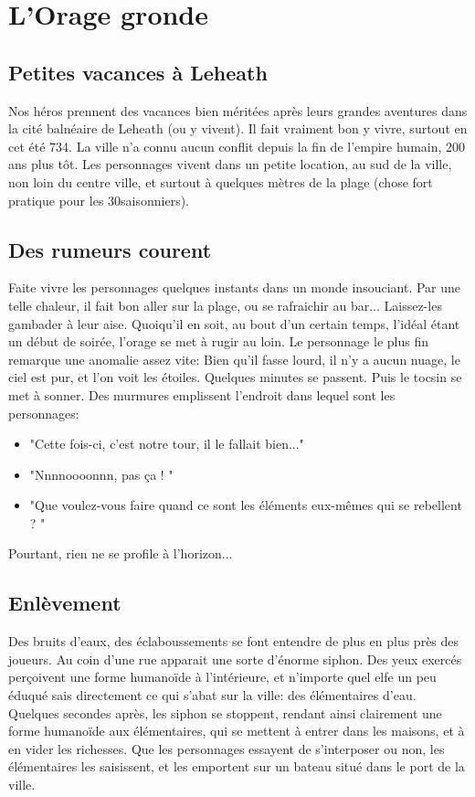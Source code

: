 \documentclass[a4paper]{article}
\begin{document}
\section{L'Orage gronde}
\subsection{Petites vacances à Leheath}
Nos héros prennent des vacances bien méritées après leurs grandes aventures dans la cité balnéaire de Leheath (ou y vivent). 
Il fait vraiment bon y vivre, surtout en cet été 734. La ville n'a connu aucun conflit depuis la fin de l'empire humain, 200 ans plus tôt.
\newline
Les personnages vivent dans un petite location, au sud de la ville, non loin du centre ville, et surtout à quelques mètres de la plage (chose fort pratique pour les 30\degre saisonniers).

\subsection{Des rumeurs courent}
Faite vivre les personnages quelques instants dans un monde insouciant. Par une telle chaleur, il fait bon aller sur la plage, ou se rafraichir au bar... Laissez-les gambader à leur aise. Quoiqu'il en soit, au bout d'un certain temps, l'idéal étant un début de soirée, l'orage se met à rugir au loin. 
\newline
Le personnage le plus fin remarque une anomalie assez vite: Bien qu'il fasse lourd, il n'y a aucun nuage, le ciel est pur, et l'on voit les étoiles. Quelques minutes se passent. Puis le tocsin se met à sonner. Des murmures emplissent l'endroit dans lequel sont les personnages:
\begin{itemize}
\item "Cette fois-ci, c'est notre tour, il le fallait bien..."
\item "Nnnnoooonnn, pas ça ! "
\item "Que voulez-vous faire quand ce sont les éléments eux-mêmes qui se rebellent ? "
\end{itemize}
Pourtant, rien ne se profile à l'horizon...

\subsection{Enlèvement}
Des bruits d'eaux, des éclaboussements se font entendre de plus en plus près des joueurs. Au coin d'une rue apparait une sorte d'énorme siphon. Des yeux exercés perçoivent une forme humanoïde à l'intérieure, et n'importe quel elfe un peu éduqué sais directement ce qui s’abat sur la ville: des élémentaires d'eau. Quelques secondes après, les siphon se stoppent, rendant ainsi clairement une forme humanoïde aux élémentaires, qui se mettent à entrer dans les maisons, et à en vider les richesses.
\newline
Que les personnages essayent de s'interposer ou non, les élémentaires les saisissent, et les emportent sur un bateau situé dans le port de la ville.
\end{document}

